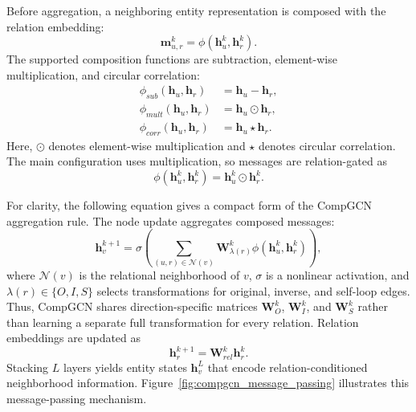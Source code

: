 Before aggregation, a neighboring entity representation is composed with the relation embedding:
\begin{equation}
    \mathbf{m}_{u,r}^{k}
    =
    \phi
    \left(
        \mathbf{h}_{u}^{k},
        \mathbf{h}_{r}^{k}
    \right).
\end{equation}
The supported composition functions are subtraction, element-wise multiplication, and circular correlation:
\begin{align}
    \phi_{sub}(\mathbf{h}_{u},\mathbf{h}_{r})
    &=
    \mathbf{h}_{u}-\mathbf{h}_{r}, \\
    \phi_{mult}(\mathbf{h}_{u},\mathbf{h}_{r})
    &=
    \mathbf{h}_{u}\odot\mathbf{h}_{r}, \\
    \phi_{corr}(\mathbf{h}_{u},\mathbf{h}_{r})
    &=
    \mathbf{h}_{u}\star\mathbf{h}_{r}.
\end{align}
Here, $\odot$ denotes element-wise multiplication and $\star$ denotes circular correlation. The main configuration uses multiplication, so messages are relation-gated as
\begin{equation}
    \phi
    \left(
        \mathbf{h}_{u}^{k},
        \mathbf{h}_{r}^{k}
    \right)
    =
    \mathbf{h}_{u}^{k}\odot\mathbf{h}_{r}^{k}.
\end{equation}

For clarity, the following equation gives a compact form of the CompGCN aggregation rule. The node update aggregates composed messages:
\begin{equation}
    \mathbf{h}_{v}^{k+1}
    =
    \sigma
    \left(
        \sum_{(u,r)\in\mathcal{N}(v)}
        \mathbf{W}_{\lambda(r)}^{k}
        \phi
        \left(
            \mathbf{h}_{u}^{k},
            \mathbf{h}_{r}^{k}
        \right)
    \right),
    \label{eq:compgcn_node_update}
\end{equation}
where $\mathcal{N}(v)$ is the relational neighborhood of $v$, $\sigma$ is a nonlinear activation, and $\lambda(r)\in\{O,I,S\}$ selects transformations for original, inverse, and self-loop edges. Thus, CompGCN shares direction-specific matrices $\mathbf{W}_{O}^{k}$, $\mathbf{W}_{I}^{k}$, and $\mathbf{W}_{S}^{k}$ rather than learning a separate full transformation for every relation. Relation embeddings are updated as
\begin{equation}
    \mathbf{h}_{r}^{k+1}
    =
    \mathbf{W}_{rel}^{k}
    \mathbf{h}_{r}^{k}.
    \label{eq:compgcn_relation_update}
\end{equation}
Stacking $L$ layers yields entity states $\mathbf{h}_{v}^{L}$ that encode relation-conditioned neighborhood information. Figure~\ref{fig:compgcn_message_passing} illustrates this message-passing mechanism.

